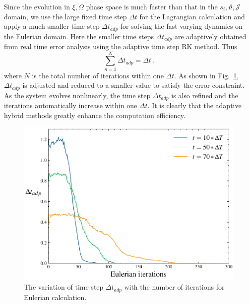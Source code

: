 Since the evolution in $\xi,\Omega$ phase space is much faster than that in the $s_i,\vartheta,\mathcal{J}$ domain,
we use the large fixed time step $\Delta t$ for the Lagrangian calculation
and  apply a much smaller time step $\Delta t_{adp}$ for solving the fast varying dynamics on the Eulerian domain. 
Here the smaller time steps $\Delta t_{adp}$ are adaptively obtained from real time error analysis using the  adaptive time step RK method.
Thus 
\begin{equation}
    \sum_{n=1}^N \Delta t_{adp}= \Delta t ~.
\end{equation}
where $N$ is the total number of iterations within one $\Delta t$. 
As shown in Fig.~\ref{fig.adapetive}, 
$\Delta t_{adp}$ is adjusted and reduced to a smaller value to satisfy the error constraint. As the system evolves nonlinearly, 
the  time step $\Delta t_{adp}$ is also refined and the iterations automatically increase within one $\Delta t$. It is clearly that the adaptive hybrid methods greatly enhance the computation efficiency.
\begin{figure}[htbp]
    \centering
    \includegraphics[scale=0.5]{cpc_img/fig_dts1.pdf}
    \caption{The variation of time step $\Delta t_{adp}$ 
     with the number of iterations for Eulerian calculation.  
    }
    \label{fig.adapetive}
\end{figure}
